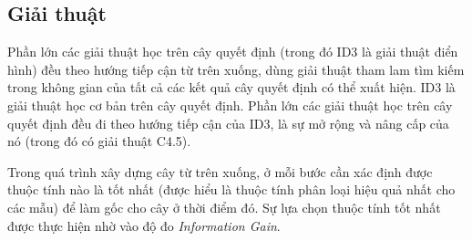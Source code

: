\documentclass[12pt]{report}
\begin{document}
			\subsection*{Giải thuật}		
				\par Phần lớn các giải thuật học trên cây quyết định (trong đó ID3 là giải thuật điển hình) đều theo hướng tiếp cận từ trên xuống, dùng giải thuật tham lam tìm kiếm trong không gian của tất cả các kết quả cây quyết định có thể xuất hiện. ID3 là giải thuật học cơ bản trên cây quyết định. Phần lớn các giải thuật học trên cây quyết định đều đi theo hướng tiếp cận của ID3, là sự mở rộng và nâng cấp của nó (trong đó có giải thuật C4.5).			
				\par Trong quá trình xây dựng cây từ trên xuống, ở mỗi bước cần xác định được thuộc tính nào là tốt nhất (được hiểu là thuộc tính phân loại hiệu quả nhất cho các mẫu) để làm gốc cho cây ở thời điểm đó. Sự lựa chọn thuộc tính tốt nhất được thực hiện nhờ vào độ đo \textit{Information Gain}.
\end{document}

